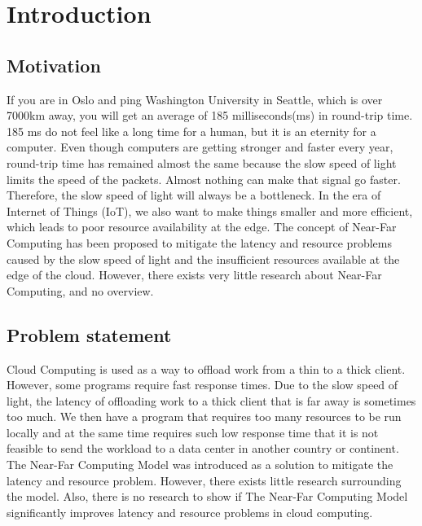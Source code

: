 \chapter{Introduction}

\section{Motivation}
If you are in Oslo and ping Washington University in Seattle, which is over 7000km away,  you will get an average of 185 milliseconds(ms) in round-trip time. 185 ms do not feel like a long time for a human, but it is an eternity for a computer. Even though computers are getting stronger and faster every year, round-trip time has remained almost the same because the slow speed of light limits the speed of the packets. Almost nothing can make that signal go faster. Therefore, the slow speed of light will always be a bottleneck. In the era of Internet of Things (IoT), we also want to make things smaller and more efficient, which leads to poor resource availability at the edge. The concept of Near-Far Computing has been proposed to mitigate the latency and resource problems caused by the slow speed of light and the insufficient resources available at the edge of the cloud. However, there exists very little research about Near-Far Computing, and no overview.



\section{Problem statement}         %
Cloud Computing is used as a way to offload work from a thin to a thick client. However, some programs require fast response times. Due to the slow speed of light, the latency of offloading work to a thick client that is far away is sometimes too much. We then have a program that requires too many resources to be run locally and at the same time requires such low response time that it is not feasible to send the workload to a data center in another country or continent. The Near-Far Computing Model was introduced as a solution to mitigate the latency and resource problem. However, there exists little research surrounding the model. Also, there is no research to show if The Near-Far Computing Model significantly improves latency and resource problems in cloud computing.


